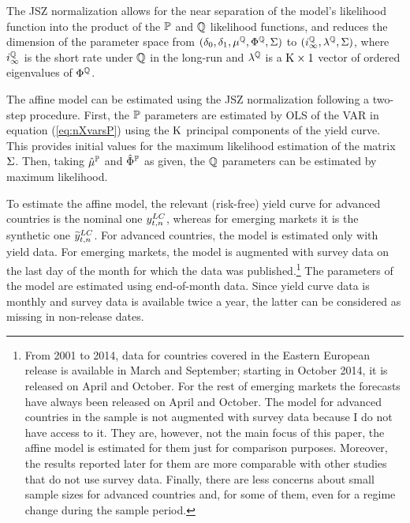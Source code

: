 {The JSZ normalization allows for the near separation of the model's likelihood function into the product of the \(\mathbb{P}\) and \(\mathbb{Q}\) likelihood functions, and reduces the dimension of the parameter space from \((\delta_{0}, \delta_{1}, \mu^{\mathbb{Q}}, \Phi^{\mathbb{Q}}, \Sigma)\) to \((i^{\mathbb{Q}}_{\infty}, \lambda^{\mathbb{Q}},\Sigma)\), where \(i^{\mathbb{Q}}_{\infty}\) is the short rate under \(\mathbb{Q}\) in the long-run and \(\lambda^{\mathbb{Q}}\) is a \(\mathrm{K} \times 1\) vector of ordered eigenvalues of \(\Phi^{\mathbb{Q}}\).

The affine model can be estimated using the JSZ normalization following a two-step procedure. 
First, the \(\mathbb{P}\) parameters are estimated by OLS of the VAR in equation (\ref{eq:nXvarsP}) using the \(\mathrm{K}\) principal components of the yield curve. This provides initial values for the maximum likelihood estimation of the matrix \(\Sigma\). Then, taking \(\hat{\mu}^{\mathbb{P}}\) and \(\hat{\Phi}^{\mathbb{P}}\) as given, the \(\mathbb{Q}\) parameters can be estimated by maximum likelihood. 

To estimate the affine model, the relevant (risk-free) yield curve for advanced countries is the nominal one \(y_{t,n} ^{LC}\), whereas for emerging markets it is the synthetic one \(\widetilde{y}_{t,n} ^{LC}\).
For advanced countries, the model is estimated only with yield data. 
For emerging markets, the model is augmented with survey data on the last day of the month for which the data was published.\footnote{ From 2001 to 2014, data for countries covered in the Eastern European release is available in March and September; starting in October 2014, it is released on April and October. For the rest of emerging markets the forecasts have always been released on April and October. The model for advanced countries in the sample is not augmented with survey data because I do not have access to it. They are, however, not the main focus of this paper, the affine model is estimated for them just for comparison purposes. Moreover, the results reported later for them are more comparable with other studies that do not use survey data. Finally, there are less concerns about small sample sizes for advanced countries and, for some of them, even for a regime change during the sample period.}
The parameters of the model are estimated using end-of-month data.
Since yield curve data is monthly and survey data is available twice a year, the latter can be considered as missing in non-release dates.

}
